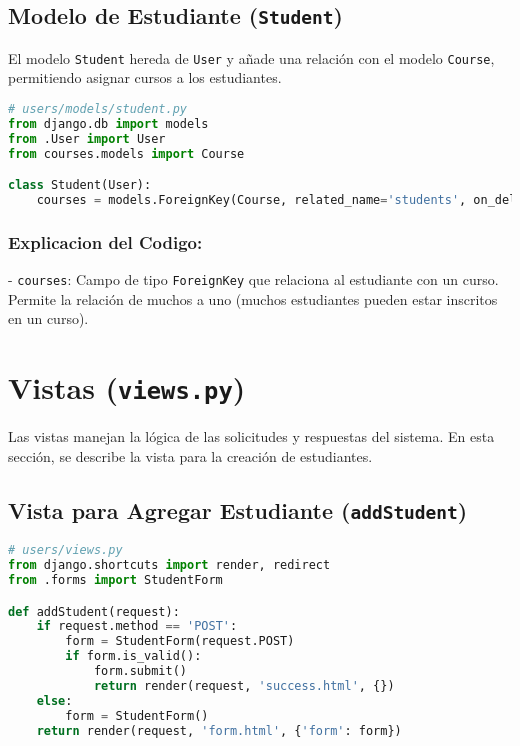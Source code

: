\subsection{Modelo de Estudiante (\texttt{Student})}

El modelo \texttt{Student} hereda de \texttt{User} y añade una relación con el modelo \texttt{Course}, permitiendo asignar cursos a los estudiantes.

\begin{lstlisting}[language=Python, caption=Modelo \texttt{Student}]
# users/models/student.py
from django.db import models
from .User import User
from courses.models import Course

class Student(User):
    courses = models.ForeignKey(Course, related_name='students', on_delete=models.CASCADE, null=True, blank=True)
\end{lstlisting}

\subsubsection{Explicacion del Codigo: }

- \texttt{courses}: Campo de tipo \texttt{ForeignKey} que relaciona al estudiante con un curso. Permite la relación de muchos a uno (muchos estudiantes pueden estar inscritos en un curso).

\section{Vistas (\texttt{views.py})}

Las vistas manejan la lógica de las solicitudes y respuestas del sistema. En esta sección, se describe la vista para la creación de estudiantes.

\subsection{Vista para Agregar Estudiante (\texttt{addStudent})}

\begin{lstlisting}[language=Python, caption=Vista para Agregar Estudiante]
# users/views.py
from django.shortcuts import render, redirect
from .forms import StudentForm

def addStudent(request):
    if request.method == 'POST':
        form = StudentForm(request.POST)
        if form.is_valid():
            form.submit()
            return render(request, 'success.html', {})
    else:
        form = StudentForm()
    return render(request, 'form.html', {'form': form})
\end{lstlisting}

